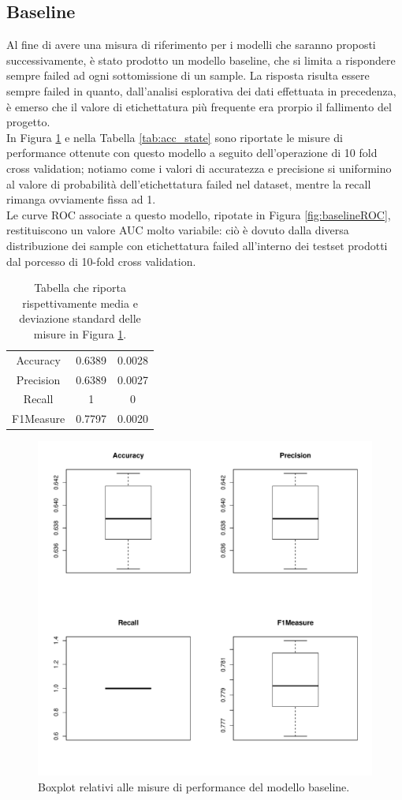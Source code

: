 \subsection{Baseline}
Al fine di avere una misura di riferimento per i modelli che saranno proposti successivamente, è stato prodotto un modello baseline, che si limita a rispondere sempre failed ad ogni sottomissione di un sample. La risposta risulta essere sempre failed in quanto, dall'analisi esplorativa dei dati effettuata in precedenza, è emerso che il valore di etichettatura più frequente era prorpio il fallimento del progetto.\\
In Figura \ref{fig:baselineperformance} e nella Tabella \ref{tab:acc_state} sono riportate le misure di performance ottenute con questo modello a seguito dell'operazione di 10 fold cross validation; notiamo come i valori di accuratezza e precisione si uniformino al valore di  probabilità dell'etichettatura failed nel dataset, mentre la recall rimanga ovviamente fissa ad 1.\\
Le curve ROC associate a questo modello, ripotate in Figura \ref{fig:baselineROC}, restituiscono un valore AUC molto variabile: ciò è dovuto dalla diversa distribuzione dei sample con etichettatura failed all'interno dei testset prodotti dal porcesso di 10-fold cross validation.
\begin{table}
	\caption{Tabella che riporta rispettivamente media e deviazione standard delle misure in Figura \ref{fig:baselineperformance}.}
	\label{tab:baselineperformance}
	\centering
	\begin{tabular}{c|c|c}
		Accuracy & 0.6389 & 0.0028 \\ 
		Precision & 0.6389 & 0.0027 \\
		Recall & 1 & 0 \\
		F1Measure & 0.7797 & 0.0020 \\
	\end{tabular}
\end{table} 
\begin{figure}
	\centering
	\includegraphics[width=0.7\linewidth]{../FinalResults/Baseline_performance}
	\caption{Boxplot relativi alle misure di performance del modello baseline.}
	\label{fig:baselineperformance}
\end{figure}

